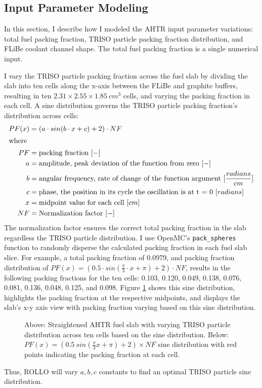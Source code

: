 \subsection{Input Parameter Modeling}
In this section, I describe how I modeled the \gls{AHTR} input
parameter variations: total fuel packing fraction, TRISO particle packing fraction 
distribution, and \gls{FLiBe} coolant channel shape. 
The total fuel packing fraction is a single numerical input.

I vary the TRISO particle packing fraction across the fuel slab by dividing the 
slab into ten cells along the x-axis between the \gls{FLiBe} and graphite 
buffers, resulting in ten $2.31 \times 2.55 \times 1.85\ cm^3$ cells, and varying
the packing fraction in each cell.
A sine distribution governs the \gls{TRISO} particle packing fraction's 
distribution across cells:
\begin{align}
    PF(x) &= \left(a\cdot sin(b\cdot x + c) + 2\right) \cdot NF\\
    \intertext{where}
    PF &= \mbox{packing fraction } [-] \nonumber \\ 
    a &= \mbox{amplitude, peak deviation of the function from zero } [-] \nonumber \\
    b &= \mbox{angular frequency, rate of change of the function argument } [\frac{radians}{cm}] \nonumber \\
    c &= \mbox{phase, the position in its cycle the oscillation is at t = 0 } [radians]\nonumber \\
    x &= \mbox{midpoint value for each cell } [cm]\nonumber \\
    NF &= \mbox{Normalization factor } [-]\nonumber
\end{align}
The normalization factor ensures the correct total packing fraction 
in the slab regardless the \gls{TRISO} particle distribution.
I use OpenMC's \texttt{pack\_spheres} function to randomly disperse the calculated packing 
fraction in each fuel slab slice. 
For example, a total packing fraction of 0.0979, and packing fraction distribution of 
$PF(x) = \left(0.5\cdot sin(\frac{\pi}{3}\cdot x + \pi) + 2\right)  \cdot NF$, 
results in the following packing fractions for the ten cells: 0.103, 0.120, 
0.049, 0.138, 0.076, 0.081, 0.136, 0.048, 0.125, and 0.098. 
Figure \ref{fig:triso_distribution} shows this sine distribution, highlights 
the packing fraction at the respective midpoints, and displays the slab's x-y 
axis view with packing fraction varying based on this sine distribution. 
\begin{figure}[H]
    \centering
    \caption{Above: Straightened \acrfull{AHTR} fuel slab with varying \gls{TRISO} particle 
    distribution across ten cells based on the sine distribution. 
    Below: $PF(x) = (0.5\ sin(\frac{\pi}{3}x + \pi) + 2)  \times NF$ 
    sine distribution with red points indicating the packing fraction at each cell. }
    \label{fig:triso_distribution}
\end{figure}
Thus, ROLLO will vary $a, b, c$ constants to find an optimal TRISO particle 
sine distribution. 

